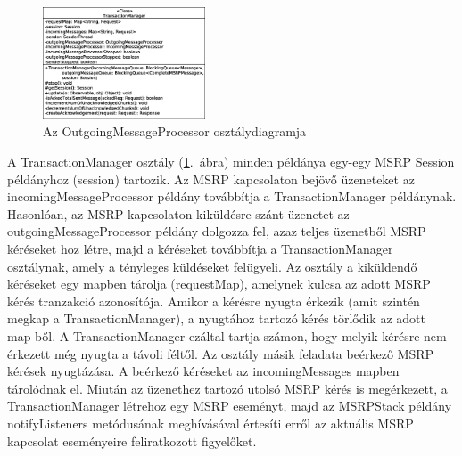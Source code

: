 \begin{figure}
  \vspace{-25pt}
  \begin{center}
    \includegraphics[width=0.43\textwidth]{img/class_diagrams/TransactionManager.eps}
  \end{center}
  \vspace{-15pt}
  \captionsetup{font=scriptsize}
  \caption{Az OutgoingMessageProcessor osztálydiagramja}
   \label{fig:class_transactionmanager}
  \vspace{-10pt}
\end{figure}
A TransactionManager osztály (\ref{fig:class_transactionmanager}.~ábra) minden példánya egy-egy MSRP Session példányhoz (session) tartozik. Az MSRP kapcsolaton bejövő üzeneteket az incomingMessageProcessor példány továbbítja a TransactionManager példánynak. Hasonlóan, az MSRP kapcsolaton kiküldésre szánt üzenetet az outgoingMessageProcessor példány dolgozza fel, azaz teljes üzenetből MSRP kéréseket hoz létre, majd a kéréseket továbbítja a TransactionManager osztálynak, amely a tényleges küldéseket felügyeli. Az osztály a kiküldendő kéréseket egy mapben tárolja (requestMap), amelynek kulcsa az adott MSRP kérés tranzakció azonosítója. Amikor a kérésre nyugta érkezik (amit szintén megkap a TransactionManager), a nyugtához tartozó kérés törlődik az adott map-ből. A TransactionManager ezáltal tartja számon, hogy melyik kérésre nem érkezett még nyugta a távoli féltől. Az osztály másik feladata beérkező MSRP kérések nyugtázása. A beérkező kéréseket az incomingMessages mapben tárolódnak el. Miután az üzenethez tartozó utolsó MSRP kérés is megérkezett, a TransactionManager létrehoz egy MSRP eseményt, majd az MSRPStack példány notifyListeners metódusának meghívásával értesíti erről az aktuális MSRP kapcsolat eseményeire feliratkozott figyelőket.

